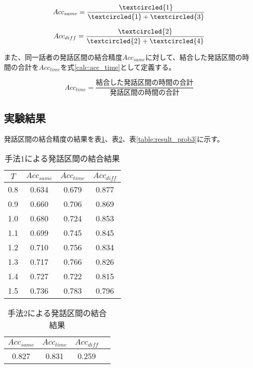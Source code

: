 \begin{equation}
\label{calc:calc_same_sp}
Acc_{same} = \frac{\textcircled{\scriptsize 1}}{\textcircled{\scriptsize 1} + \textcircled{\scriptsize 3}}
\end{equation}

\begin{equation}
\label{calc:calc_different_sp}
Acc_{diff} = \frac{\textcircled{\scriptsize 2}}{\textcircled{\scriptsize 2} + \textcircled{\scriptsize 4}}
\end{equation}

また、同一話者の発話区間の結合精度$Acc_{same}$に対して、結合した発話区間の時間の合計を$Acc_{time}$を式\ref{calc:acc_time}として定義する。

\begin{equation}
\label{calc:acc_time}
Acc_{time} = \frac{結合した発話区間の時間の合計}{発話区間の時間の合計}
\end{equation}

\subsection{実験結果}
発話区間の結合精度の結果を表\ref{table:result_prob1}、表\ref{table:result_prob2}、表\ref{table:result_prob3}に示す。

\begin{table}[H]
\begin{center}
\caption{手法1による発話区間の結合結果 \label{table:result_prob1}}
\begin{tabular}{|c|c|c|c|}
\hline
$T$   & $Acc_{same}$ & $Acc_{time}$ & $Acc_{diff}$ \\ \hline
0.8 & 0.634    & 0.679    & 0.877    \\ \hline
0.9 & 0.660    & 0.706    & 0.869    \\ \hline
1.0 & 0.680    & 0.724    & 0.853    \\ \hline
1.1 & 0.699    & 0.745    & 0.845    \\ \hline
1.2 & 0.710    & 0.756    & 0.834    \\ \hline
1.3 & 0.717    & 0.766    & 0.826    \\ \hline
1.4 & 0.727    & 0.722    & 0.815    \\ \hline
1.5 & 0.736    & 0.783    & 0.796    \\ \hline
\end{tabular}
\end{center}
\end{table}

\begin{table}[H]
\begin{center}
\caption{手法2による発話区間の結合結果 \label{table:result_prob2}}
\begin{tabular}{|c|c|c|c|}
\hline
$Acc_{same}$ & $Acc_{time}$ & $Acc_{diff}$ \\ \hline
0.827 & 0.831    & 0.259    \\ \hline
\end{tabular}
\end{center}
\end{table}

